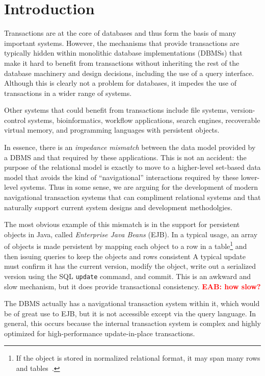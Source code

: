 \documentclass[10pt,letterpaper,twocolumn,english]{article}
\newcommand{\eab}[1]{\textcolor{red}{\bf EAB: #1}}
\begin{document}
\section{Introduction}

Transactions are at the core of databases and thus form the basis of many
important systems. However, the mechanisms that provide transactions are
typically hidden within monolithic database implementations (DBMSs) that make
it hard to benefit from transactions without inheriting the rest of
the database machinery and design decisions, including the use of a
query interface.  Although this is clearly not a problem for
databases, it impedes the use of transactions in a wider range of
systems.

Other systems that could benefit from transactions include file
systems, version-control systems, bioinformatics, workflow
applications, search engines, recoverable virtual memory, and
programming languages with persistent objects.

In essence, there is an {\em impedance mismatch} between the data
model provided by a DBMS and that required by these applications. This is
not an accident: the purpose of the relational model is exactly to
move to a higher-level set-based data model that avoids the kind of
``navigational'' interactions required by these lower-level systems.
Thus in some sense, we are arguing for the development of modern
navigational transaction systems that can compliment relational systems 
and that naturally support current system designs and development methodolgies.

The most obvious example of this mismatch is in the support for
persistent objects in Java, called {\em Enterprise Java Beans}
(EJB). In a typical usage, an array of objects is made persistent by
mapping each object to a row in a table\footnote{If the object is
stored in normalized relational format, it may span many rows and tables~\cite{Hibernate}.} 
and then issuing queries to
keep the objects and rows consistent  A typical update must confirm
it has the current version, modify the object, write out a serialized
version using the SQL {\tt update} command, and commit.  This is an
awkward and slow mechanism, but it does provide transactional
consistency. \eab{how slow?}

The DBMS actually has a navigational transaction system within it,
which would be of great use to EJB, but it is not accessible except
via the query language.  In general, this occurs because the internal
transaction system is complex and highly optimized for
high-performance update-in-place transactions.
\end{document}
